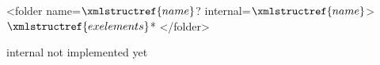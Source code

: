 <folder name=$\xmlstructref{name}$? internal=$\xmlstructref{name}$>
  $\xmlstructref{exelements}$*
</folder>

internal not implemented yet

